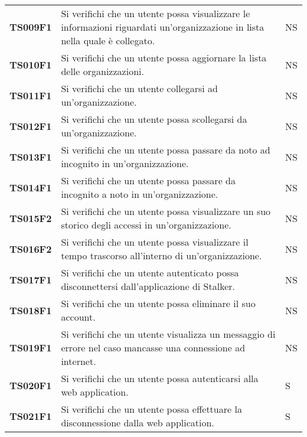 \documentclass[../../piano-di-qualifica.tex]{subfiles}
\begin{document}
\begin{longtable}[H]{>{\centering\bfseries}m{3cm} >{}m{10cm} >{\centering\arraybackslash}m{3cm}}
  TS009F1            & Si verifichi che un utente possa visualizzare le informazioni riguardati un'organizzazione in lista nella quale è collegato. 
  & NS               \\


  TS010F1            & Si verifichi che un utente possa aggiornare la lista delle organizzazioni. 
  & NS               \\

  TS011F1            & Si verifichi che un utente collegarsi ad un'organizzazione. 
  & NS               \\

  TS012F1            & Si verifichi che un utente possa scollegarsi da un'organizzazione. 
  & NS               \\

  TS013F1            & Si verifichi che un utente possa passare da noto ad incognito in un'organizzazione. 
  & NS               \\

  TS014F1            & Si verifichi che un utente possa passare da incognito a noto in un'organizzazione. 
  & NS               \\

  TS015F2            & Si verifichi che un utente possa visualizzare un suo storico degli accessi in un'organizzazione. 
  & NS               \\

  TS016F2            & Si verifichi che un utente possa visualizzare il tempo trascorso all'interno di un'organizzazione. 
  & NS               \\

  TS017F1            & Si verifichi che un utente autenticato possa disconnettersi dall'applicazione di Stalker. 
  & NS               \\

  TS018F1            & Si verifichi che un utente possa eliminare il suo account. 
  & NS               \\

  TS019F1            & Si verifichi che un utente visualizza un messaggio di errore nel caso mancasse una connessione ad internet. 
  & NS               \\

  TS020F1            & Si verifichi che un utente possa autenticarsi alla web application. 
  & S               \\

  TS021F1            & Si verifichi che un utente possa effettuare la disconnessione dalla web application. 
  & S               \\
  

\end{longtable}
\end{document}
